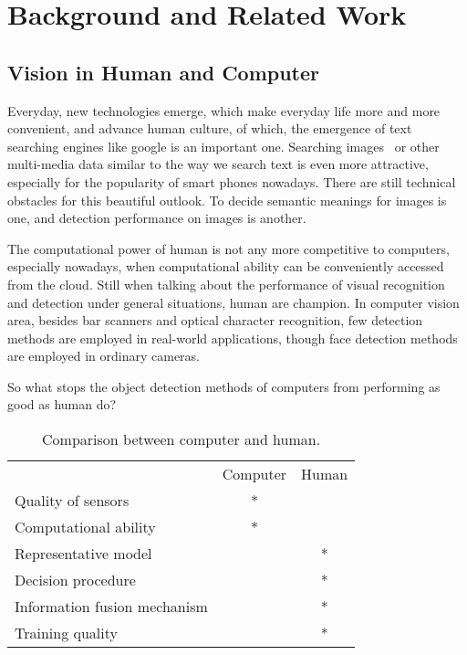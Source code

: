 \chapter{Background and Related Work}
\label{chp2}

\section{Vision in Human and Computer}

Everyday, new technologies emerge, which make everyday life more and more convenient, and advance human culture, of which, the emergence of text searching engines like google is  an important one. Searching images~\cite{bisearch} or other multi-media data similar to the way we search text is even more attractive, especially for the popularity of smart phones nowadays. There are still technical obstacles for this beautiful outlook. To decide semantic meanings for images is one, and detection performance on images is another.



The computational power of human is not any more competitive to computers, especially nowadays, when computational ability can be conveniently accessed from the cloud.
Still when talking about the performance of visual recognition and detection under general situations, human are champion. In computer vision area, besides bar scanners and optical character recognition, few detection methods are employed in real-world applications, though face detection methods are employed in ordinary cameras.

So what stops the object detection methods of computers from performing as good as human do?

\begin{table}[h]
\centering
\begin{tabular}{lcc}
     \hline
     \hline
                               &	Computer & Human \\
    Quality of sensors         &	* &   \\
    Computational ability      &	* &	  \\
    Representative model       &	  & * \\
    Decision procedure         &      & *	  \\
    Information fusion mechanism & & *           \\
    Training quality           &      & *	   \\
   \hline
\end{tabular}
\caption[Power comparison between computer and human]{Comparison between computer and human.}\label{c2tb:tb1}
\end{table}


